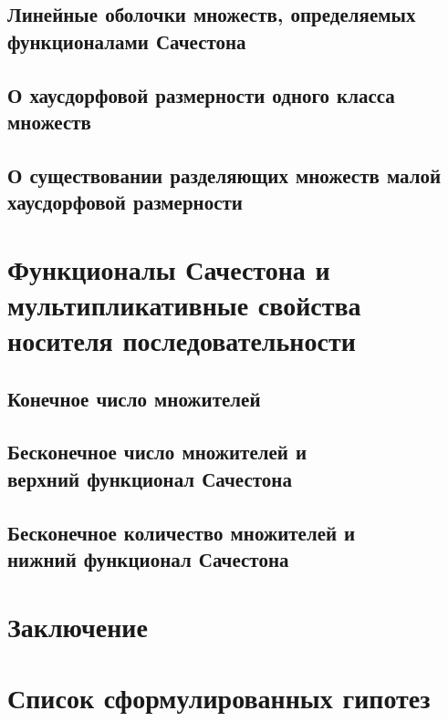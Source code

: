 \documentclass[12pt,a4paper,openbib]{report}
\theoremstyle{definition}
\newcommand\hypotlist{ }
\begin{document}
	\section{Линейные оболочки множеств, определяемых функционалами Сачестона}
	

	\section{О хаусдорфовой размерности одного класса множеств}
	

	\section{О существовании разделяющих множеств малой хаусдорфовой размерности}
	


\chapter{Функционалы Сачестона и мультипликативные свойства носителя последовательности}

	

	\section{Конечное число множителей}
	

	\section{Бесконечное число множителей и \\  верхний функционал Сачестона}
	

	\section{Бесконечное количество множителей и \\ нижний функционал Сачестона}
	




\chapter*{Заключение}



\chapter*{Список сформулированных гипотез}

\renewcommand\label[1]{}
\hypotlist



\makeatletter
{}%
{\toggletrue{bbx:gostbibliography}%
\renewcommand*{\revsdnamepunct}{\addcomma}}{}
\makeatother

\printbibliography{}
\end{document}
